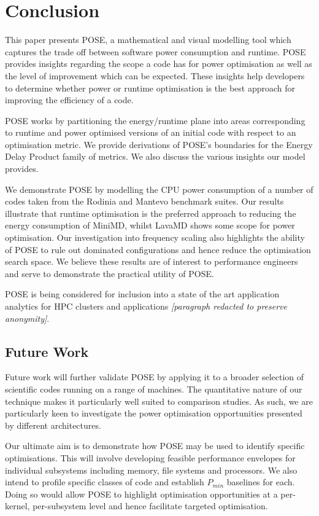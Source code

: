 \section{Conclusion}
\label{sec:conclusion}
\noindent
This paper presents POSE, a mathematical and visual modelling tool which captures the trade off between software power consumption and runtime.
POSE provides insights regarding the scope a code has for power optimisation as well as the level of improvement which can be expected.
These insights help developers to determine whether power or runtime optimisation is the best approach for improving the efficiency of a code.

POSE works by partitioning the energy/runtime plane into areas corresponding to runtime and power optimised versions of an initial code with respect to an optimisation metric.
We provide derivations of POSE's boundaries for the Energy Delay Product family of metrics.
We also discuss the various insights our model provides.

We demonstrate POSE by modelling the CPU power consumption of a number of codes taken from the Rodinia and Mantevo benchmark suites.  
Our results illustrate that runtime optimisation is the preferred approach to reducing the energy consumption of MiniMD, whilst LavaMD shows some scope for power optimisation.
Our investigation into frequency scaling also highlights the ability of POSE to rule out dominated configurations and hence reduce the optimisation search space.
We believe these results are of interest to performance engineers and serve to demonstrate the practical utility of POSE.

POSE is being considered for inclusion into a state of the art application analytics for HPC clusters and applications \textit{[paragraph redacted to preserve anonymity]}.

\subsection*{Future Work}
\noindent
Future work will further validate POSE by applying it to a broader selection of scientific codes running on a range of machines.
The quantitative nature of our technique makes it particularly well suited to comparison studies.
As such, we are particularly keen to investigate the power optimisation opportunities presented by different architectures.

Our ultimate aim is to demonstrate how POSE may be used to identify specific optimisations.
This will involve developing feasible performance envelopes for individual subsystems including memory, file systems and processors. 
We also intend to profile specific classes of code and establish $P_{min}$ baselines for each.
Doing so would allow POSE to highlight optimisation opportunities at a per-kernel, per-subsystem level and hence facilitate targeted optimisation.
